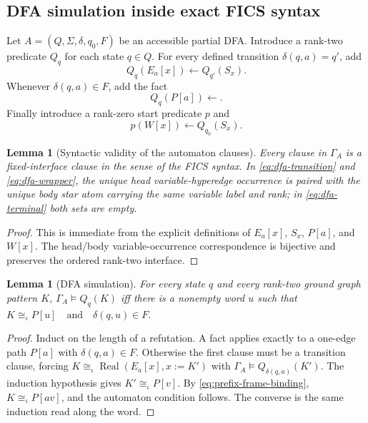 \documentclass[11pt]{article}
\newtheorem{lemma}[theorem]{Lemma}
\theoremstyle{definition}
\theoremstyle{remark}
\newcommand{\Real}{\operatorname{Real}}
\begin{document}
\subsection{DFA simulation inside exact FICS syntax}

Let
\(A=(Q,\Sigma,\delta,q_0,F)\)
be an accessible partial DFA. Introduce a rank-two predicate \(Q_q\) for each
state \(q\in Q\). For every defined transition \(\delta(q,a)=q'\), add
\begin{equation}
\label{eq:dfa-transition}
Q_q(E_a[x])\leftarrow Q_{q'}(S_x).
\end{equation}
Whenever \(\delta(q,a)\in F\), add the fact
\begin{equation}
\label{eq:dfa-terminal}
Q_q(P[a])\leftarrow.
\end{equation}
Finally introduce a rank-zero start predicate \(p\) and
\begin{equation}
\label{eq:dfa-wrapper}
p(W[x])\leftarrow Q_{q_0}(S_x).
\end{equation}

\begin{lemma}[Syntactic validity of the automaton clauses]
Every clause in \(\Gamma_A\) is a fixed-interface clause in the sense of the
FICS syntax.  In \eqref{eq:dfa-transition} and \eqref{eq:dfa-wrapper}, the
unique head variable-hyperedge occurrence is paired with the unique body star
atom carrying the same variable label and rank; in \eqref{eq:dfa-terminal}
both sets are empty.
\end{lemma}

\begin{proof}
This is immediate from the explicit definitions of \(E_a[x]\), \(S_x\),
\(P[a]\), and \(W[x]\). The head/body variable-occurrence correspondence is
bijective and preserves the ordered rank-two interface.
\end{proof}

\begin{lemma}[DFA simulation]\label{lem:dfa-sim}
For every state \(q\) and every rank-two ground graph pattern \(K\),
\(\Gamma_A\models Q_q(K)\)
iff there is a nonempty word \(u\) such that
\(K\cong_\iota P[u] \quad\text{and}\quad \delta(q,u)\in F.\)
\end{lemma}

\begin{proof}
Induct on the length of a refutation. A fact applies exactly to a one-edge
path \(P[a]\) with \(\delta(q,a)\in F\). Otherwise the first clause must be a
transition clause, forcing
\(K\cong_\iota\Real(E_a[x],x:=K')\)
with \(\Gamma_A\models Q_{\delta(q,a)}(K')\). The induction hypothesis gives
\(K'\cong_\iota P[v]\).  By \eqref{eq:prefix-frame-binding},
\(K\cong_\iota P[av]\), and the automaton condition follows. The converse is the same induction read along the word.
\end{proof}
\end{document}
